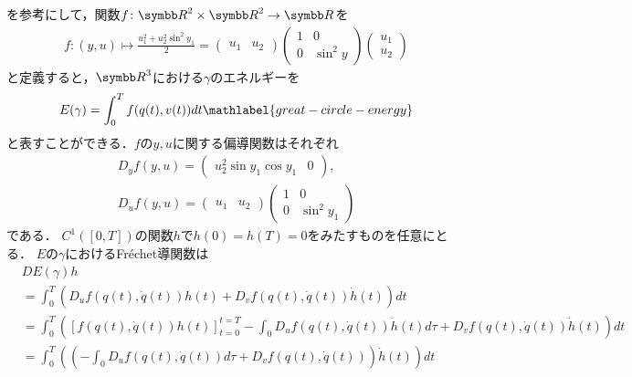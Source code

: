 \documentclass{ltjsarticle}
\begin{document}
を参考にして，関数\(f \colon {\Real}^2 \times {\Real}^2 \to {\Real}\)を
\begin{gather*}
    f\colon (y, u) \mapsto \frac{u_1^2 + u_2^2 \sin^2 y_1}{2}
    =
    \begin{pmatrix}
        u_1 & u_2
    \end{pmatrix}
    \begin{pmatrix}
        1 & 0 \\
        0 & \sin^2 y
    \end{pmatrix}
    \begin{pmatrix}
        u_1 \\ u_2
    \end{pmatrix}
\end{gather*}
と定義すると，\({\Real}^3\)における\(\gamma\)のエネルギーを
\begin{align}
    E(\gamma) = \int_0^T f(q(t), v(t)) dt
    \mathlabel{great-circle-energy}
\end{align}
と表すことができる．\(f\)の\(y, u\)に関する偏導関数はそれぞれ
\begin{gather*}
    D_y f(y, u)
    =
    \begin{pmatrix}
        u_2^2 \sin y_1 \cos y_1 & 0
    \end{pmatrix},
    \\
    D_u f(y, u)
    =
    \begin{pmatrix}
        u_1 & u_2
    \end{pmatrix}
    \begin{pmatrix}
        1 & 0 \\
        0 & \sin^2 y_1
    \end{pmatrix}
\end{gather*}
である．
\(C^1([0, T])\)の関数\(h\)で\(h(0) = h(T) = 0\)をみたすものを任意にとる．
\(E\)の\(\gamma\)におけるFréchet導関数は
\begin{align*}
    & DE(\gamma)h \\
    & = \int_0^T \left(D_u f(q(t), \dot{q}(t)) h(t) + D_v f(q(t), \dot{q}(t))\dot{h}(t)\right) dt \\
    & = \int_0^T \left([f(q(t), \dot{q}(t))h(t)]_{t = 0}^{t = T} - \int_0 D_u f(q(t), \dot{q}(t)) \dot{h}(t) d\tau + D_v f(q(t), \dot{q}(t))\dot{h}(t)\right) dt \\
    & = \int_0^T
    \left(
        \left(
        - \int_0 D_u f(q(t), \dot{q}(t)) d\tau
        +  D_v f(q(t), \dot{q}(t))
        \right)
        \dot{h}(t)
    \right) dt
\end{align*}
\end{document}
